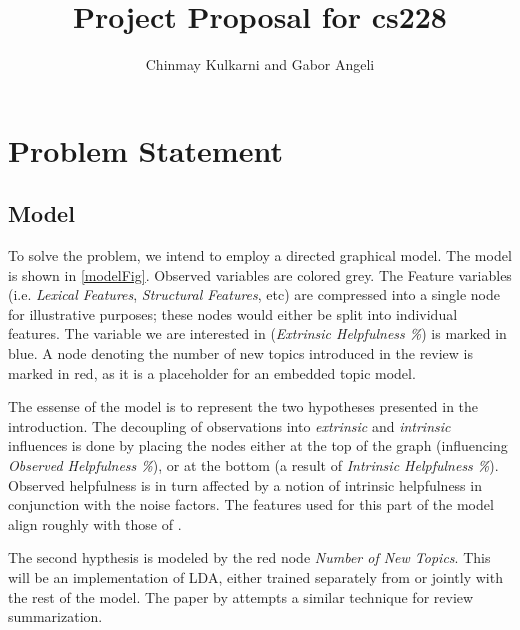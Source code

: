 \documentclass[12pt,letterpaper]{article}
\title{Project Proposal for cs228}
\author{Chinmay Kulkarni and Gabor Angeli}
\begin{document}
\maketitle

\section{Problem Statement}

\subsection{Model}
To solve the problem, we intend to employ a directed graphical model.
The model is shown in \ref{modelFig}.
Observed variables are colored grey. 
The Feature variables (i.e. {\em Lexical Features}, {\em Structural Features}, 
	etc) are compressed into a single node for illustrative purposes;
	these nodes would either be split into individual features.
The variable we are interested in ({\em Extrinsic Helpfulness \%}) is marked
	in blue.
A node denoting the number of new topics introduced in the review is marked
	in red, as it is a placeholder for an embedded topic model.

The essense of the model is to represent the two hypotheses presented in the
	introduction. 
The decoupling of observations into {\em extrinsic} and
	{\em intrinsic} influences is done by placing the nodes either at the top
	of the graph (influencing {\em Observed Helpfulness \%}), or at the bottom
	(a result of {\em Intrinsic Helpfulness \%}).
Observed helpfulness is in turn affected by a notion of intrinsic helpfulness
	in conjunction with the noise factors.
The features used for this part of the model align roughly with those of
	.

The second hypthesis is modeled by the red node {\em Number of New Topics}.
This will be an implementation of LDA, either trained separately from or
	jointly with the rest of the model.
The paper by  attempts a similar technique
	for review summarization.
\end{document}
